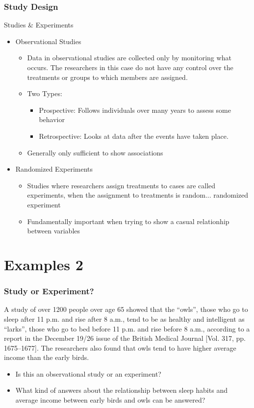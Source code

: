 \documentclass[mathserif]{beamer}
\begin{document}
\begin{frame}
\frametitle{Study Design}

Studies \& Experiments

\begin{itemize}
	\item{Observational Studies}
	\begin{itemize}
		\item{Data in observational studies are collected only by monitoring what occurs.  The researchers in this case do not have any control over the treatments or groups to which members are assigned.}
		\item{Two Types:}
		\begin{itemize}
			\item{Prospective: Follows individuals over many years to assess some behavior}
			\item{Retrospective:  Looks at data after the events have taken place.  }
		\end{itemize}
		\item{Generally only sufficient to show associations}
	\end{itemize}
	\item{Randomized Experiments}
	\begin{itemize}
		\item{Studies where researchers assign treatments to cases are called experiments, when the assignment to treatments is random... randomized experiment}
		\item{Fundamentally important when trying to show a casual relationhip between variables}
	\end{itemize}
\end{itemize}

\end{frame}

\section{Examples 2}

\begin{frame}[t]
\frametitle{Study or Experiment?}
A study of over 1200 people over age 65 showed that the “owls”, those who go to sleep after 11 p.m. and rise after 8 a.m., tend to be as healthy and intelligent as “larks”, those who go to bed before 11 p.m. and rise before 8 a.m., according to a report in the December 19/26 issue of the British Medical Journal [Vol. 317, pp. 1675–1677]. The researchers also found that owls tend to have higher average income than the early birds.
\begin{itemize}
\item{Is this an observational study or an experiment?}
\item{What kind of answers about the relationship between sleep habits and average income between early birds and owls can be answered?}
\end{itemize}
\end{frame}
\end{document}

